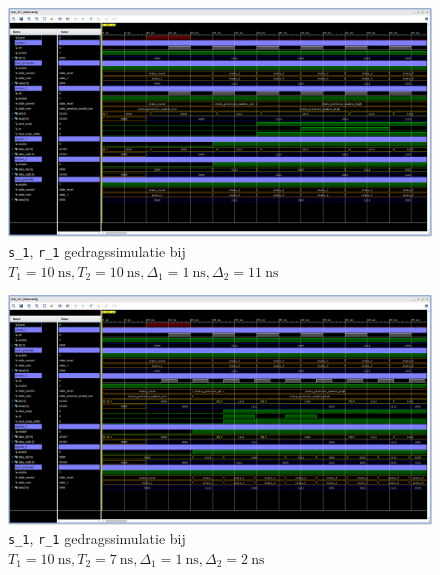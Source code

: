\documentclass[titlepage]{article}
\begin{document}
\begin{figure}[htpb]
    \centering
    \includegraphics[trim={0 100px 0 0}, clip, width =\linewidth]{sr1_gedragssimulatie_10_10_1_11.PNG}
    \caption{\texttt{s\_1}, \texttt{r\_1} gedragssimulatie bij \(T_1 = \SI{10}{\nano\second}, T_2 = \SI{10}{\nano\second}, \Delta_1 = \SI{1}{\nano\second}, \Delta_2 = \SI{11}{\nano\second} \)}
    \label{fig:sr1_behav_10_10_1_11}
\end{figure}

\begin{figure}[htpb]
    \centering
    \includegraphics[trim={0 100px 0 0}, clip, width =\linewidth]{sr1_gedragssimulatie_10_7_1_2.PNG}
    \caption{\texttt{s\_1}, \texttt{r\_1} gedragssimulatie bij \(T_1 = \SI{10}{\nano\second}, T_2 = \SI{7}{\nano\second}, \Delta_1 = \SI{1}{\nano\second}, \Delta_2 = \SI{2}{\nano\second} \)}
    \label{fig:sr1_behav_10_7_1_2}
\end{figure}
\end{document}

